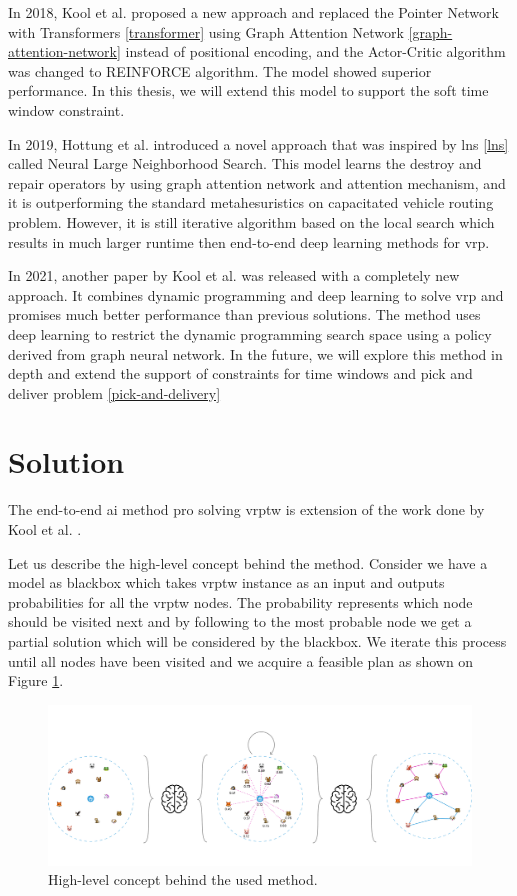 In 2018, Kool et al. \cite{attention-route} proposed a new approach and replaced the Pointer Network with Transformers \ref{transformer} using Graph Attention Network \ref{graph-attention-network} instead of positional encoding, and the Actor-Critic algorithm was changed to REINFORCE algorithm. The model showed superior performance. In this thesis, we will extend this model to support the soft time window constraint.

In 2019, Hottung et al. \cite{hottung} introduced a novel approach that was inspired by \gls{lns} \ref{lns} called Neural Large Neighborhood Search. This model learns the destroy and repair operators by using graph attention network and attention mechanism, and it is outperforming the standard metahesuristics on capacitated vehicle routing problem. However, it is still iterative algorithm based on the local search which results in much larger runtime then end-to-end deep learning methods for \gls{vrp}.

In 2021, another paper by Kool et al.\cite{dpdp} was released with a completely new approach. It combines  dynamic programming and deep learning to solve \gls{vrp} and promises much better performance than previous solutions. The method uses deep learning to restrict the dynamic programming search space using a policy derived from graph neural network. In the future, we will explore this method in depth and extend the support of constraints for time windows and pick and deliver problem \ref{pick-and-delivery}

\section{Solution}
The end-to-end \gls{ai} method pro solving \gls{vrptw} is extension of the work done by Kool et al. \cite{attention-route}. 

Let us describe the high-level concept behind the method. Consider we have a model as blackbox which takes \gls{vrptw} instance as an input and outputs probabilities for all the \gls{vrptw} nodes. The probability represents which node should be visited next and by following to the most probable node we get a partial solution which will be considered by the blackbox. We iterate this process until all nodes have been visited and we acquire a feasible plan as shown on Figure \ref{fig:attention-route-diagram}.

    \begin{figure}[ht]
        \centering
        \includegraphics[width=1.0\textwidth]{resources/vrptw-ai/attention-route-diagram.pdf}
        \caption{High-level concept behind the used method.}
        \label{fig:attention-route-diagram}
    \end{figure}


